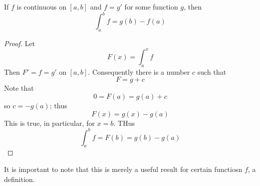 \documentclass[12pt, a4paper, oneside, openright, titlepage]{book}
\begin{document}
\begin{cor}
    If $f$ is continuous on $[a,b]$ and $f = g'$ for some function $g$, then \begin{equation}
        \int_a^bf = g(b) - f(a)
    \end{equation}
\end{cor}
\begin{proof}
    Let \begin{equation*}
        F(x) = \int_a^xf
    \end{equation*}
    Then $F' = f = g'$ on $[a,b]$. Consequently there is a number $c$ such that \begin{equation*}
        F = g+c
    \end{equation*}
    Note that $$0 = F(a) = g(a) + c$$ so $c = -g(a)$; thus \begin{equation*}
        F(x) = g(x) - g(a)
    \end{equation*}
    This is true, in particular, for $x = b$. THus \begin{equation*}
        \int_a^bf = F(b) = g(b) - g(a)
    \end{equation*}
\end{proof}

\begin{rmk}
    It is important to note that this is merely a useful result for certain functiosn $f$,  a definition.
\end{rmk}
\end{document}
